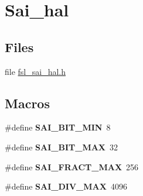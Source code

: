 \hypertarget{group__sai__hal}{}\section{Sai\+\_\+hal}
\label{group__sai__hal}
\subsection*{Files}
\begin{DoxyCompactItemize}
\item 
file \hyperlink{fsl__sai__hal_8h}{fsl\+\_\+sai\+\_\+hal.\+h}
\end{DoxyCompactItemize}
\subsection*{Macros}
\begin{DoxyCompactItemize}
\item 
\#define {\bfseries S\+A\+I\+\_\+\+B\+I\+T\+\_\+\+M\+IN}~8\hypertarget{group__sai__hal_ga7b13d0ffc01e411db72fdf1f4216a4fe}{}\label{group__sai__hal_ga7b13d0ffc01e411db72fdf1f4216a4fe}

\item 
\#define {\bfseries S\+A\+I\+\_\+\+B\+I\+T\+\_\+\+M\+AX}~32\hypertarget{group__sai__hal_gacba77968a1257ba8b757357375def021}{}\label{group__sai__hal_gacba77968a1257ba8b757357375def021}

\item 
\#define {\bfseries S\+A\+I\+\_\+\+F\+R\+A\+C\+T\+\_\+\+M\+AX}~256\hypertarget{group__sai__hal_ga79e547e8e1b1accbfe225f8a5ea8be24}{}\label{group__sai__hal_ga79e547e8e1b1accbfe225f8a5ea8be24}

\item 
\#define {\bfseries S\+A\+I\+\_\+\+D\+I\+V\+\_\+\+M\+AX}~4096\hypertarget{group__sai__hal_ga69f5ae899eb6ae994444fa415aa936a8}{}\label{group__sai__hal_ga69f5ae899eb6ae994444fa415aa936a8}

\end{DoxyCompactItemize}

